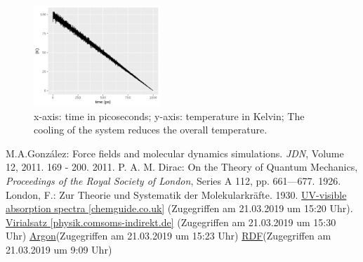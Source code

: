 \documentclass[10pt, a4paper, oneside, twocolumn]{article}
\begin{document}
\begin{figure}[t]
    \centering
    \includegraphics[width=180px]{plots//freezing/freezing_temp.png}
    \caption{x-axis: time in picoseconds; y-axis: temperature in Kelvin; The cooling of the system reduces the overall temperature.}
    \label{freezing_temp}
\end{figure}


\begin{thebibliography}{100}
 M.A.González: Force fields and molecular dynamics simulations. \textit{JDN}, Volume 12, 2011. 169 - 200. 2011.
 P. A. M. Dirac: On the Theory of Quantum Mechanics, \textit{Proceedings of the Royal Society of London}, Series A 112, pp. 661—677. 1926.
 London, F.: Zur Theorie und Systematik der Molekularkräfte. 1930. 
  \hyperlink{http://www.chemguide.co.uk/analysis/uvvisible/theory.html}{UV-visible absorption spectra [chemguide.co.uk]} (Zugegriffen am 21.03.2019 um 15:20 Uhr).
 \hyperlink{https://physik.cosmos-indirekt.de/Physik-Schule/Virialsatz}{Virialsatz [physik.comsoms-indirekt.de]} (Zugegriffen am 21.03.2019 um 15:30 Uhr)
 \hyperlink{http://www.sklogwiki.org/SklogWiki/index.php/Argon}{Argon}(Zugegriffen am 21.03.2019 um 15:23 Uhr)
 \hyperlink{https://www.ncbi.nlm.nih.gov/pmc/articles/PMC349093/?page=4}{RDF}(Zugegriffen am 21.03.2019 um 9:09 Uhr)
\end{thebibliography}
\end{document}
